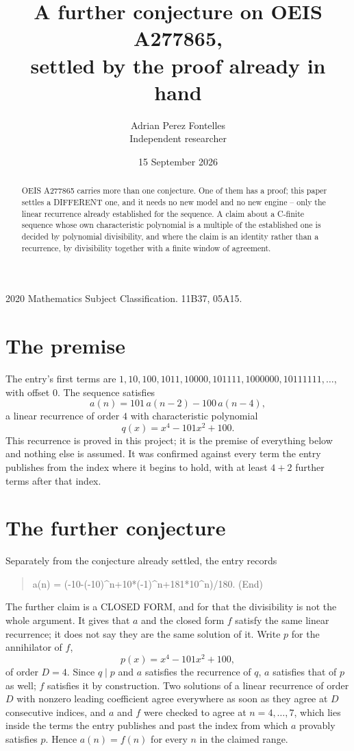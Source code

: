 \documentclass[11pt,a4paper]{article}
\title{A further conjecture on OEIS A277865,\\ \large settled by the proof already in hand}
\author{Adrian Perez Fontelles\\ \small Independent researcher}
\date{15 September 2026}
\theoremstyle{plain}
\theoremstyle{definition}
\begin{document}
\maketitle

\begin{abstract}
OEIS A277865 carries more than one conjecture. One of them has a proof; this paper settles a
DIFFERENT one, and it needs no new model and no new engine -- only the linear recurrence already
established for the sequence. A claim about a C-finite sequence whose own characteristic
polynomial is a multiple of the established one is decided by polynomial divisibility, and where
the claim is an identity rather than a recurrence, by divisibility together with a finite window
of agreement.
\end{abstract}

\noindent\small 2020 Mathematics Subject Classification. 11B37, 05A15.\normalsize

\section{The premise}

The entry's first terms are $1, 10, 100, 1011, 10000, 101111, 1000000, 10111111,\dots$, with offset $0$. The sequence satisfies
\[
  a(n)=101\,a(n-2) - 100\,a(n-4) ,
\]
a linear recurrence of order $4$ with characteristic polynomial
\[
  q(x)=x^{4} - 101 x^{2} + 100 .
\]
This recurrence is proved in this project; it is the premise of everything below and nothing else is assumed.
It was confirmed against every term the entry publishes from the index where it begins to hold,
with at least $4+2$ further terms after that index.

\section{The further conjecture}

Separately from the conjecture already settled, the entry records

\begin{quote}\raggedright a(n) = (-10-(-10)\^{}n+10*(-1)\^{}n+181*10\^{}n)/180. (End)\end{quote}

The further claim is a CLOSED FORM, and for that the divisibility is not the whole argument. It
gives that $a$ and the closed form $f$ satisfy the same linear recurrence; it does not say they
are the same solution of it. Write $p$ for the annihilator of $f$,
\[
  p(x)=x^{4} - 101 x^{2} + 100 ,
\]
of order $D=4$. Since $q\mid p$ and $a$ satisfies the recurrence of $q$, $a$ satisfies that of
$p$ as well; $f$ satisfies it by construction. Two solutions of a linear recurrence of order $D$
with nonzero leading coefficient agree everywhere as soon as they agree at $D$ consecutive
indices, and $a$ and $f$ were checked to agree at $n=4,\dots,7$,
which lies inside the terms the entry publishes and past the index from which $a$ provably
satisfies $p$. Hence $a(n)=f(n)$ for every $n$ in the claimed range.
\end{document}
